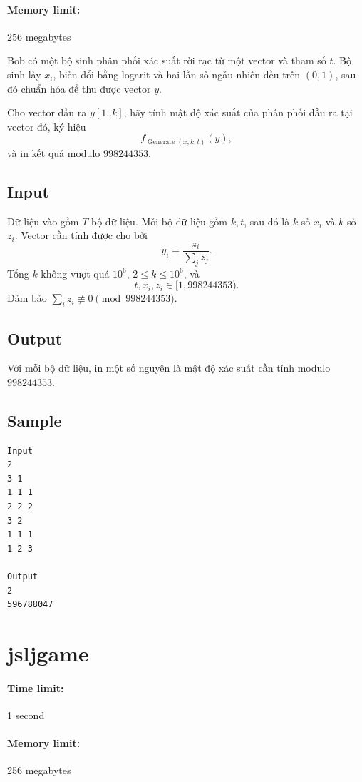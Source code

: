 \documentclass[11pt]{article}
\begin{document}
\paragraph{Memory limit:} 256 megabytes

Bob có một bộ sinh phân phối xác suất rời rạc từ một vector và tham số \(t\).
Bộ sinh lấy \(x_i\), biến đổi bằng logarit và hai lần số ngẫu nhiên đều trên
\((0,1)\), sau đó chuẩn hóa để thu được vector \(y\).

Cho vector đầu ra \(y[1..k]\), hãy tính mật độ xác suất của phân phối đầu ra
tại vector đó, ký hiệu
\[
  f_{\operatorname{Generate}(x,k,t)}(y),
\]
và in kết quả modulo \(998244353\).

\subsection*{Input}

Dữ liệu vào gồm \(T\) bộ dữ liệu. Mỗi bộ dữ liệu gồm \(k,t\), sau đó là \(k\) số
\(x_i\) và \(k\) số \(z_i\). Vector cần tính được cho bởi
\[
  y_i=\frac{z_i}{\sum_j z_j}.
\]
Tổng \(k\) không vượt quá \(10^6\), \(2\le k\le 10^6\), và
\[
  t,x_i,z_i\in[1,998244353).
\]
Đảm bảo \(\sum_i z_i\not\equiv0\pmod {998244353}\).

\subsection*{Output}

Với mỗi bộ dữ liệu, in một số nguyên là mật độ xác suất cần tính modulo
\(998244353\).

\subsection*{Sample}

\begin{verbatim}
Input
2
3 1
1 1 1
2 2 2
3 2
1 1 1
1 2 3

Output
2
596788047
\end{verbatim}

\section{jsljgame}

\paragraph{Time limit:} 1 second
\paragraph{Memory limit:} 256 megabytes
\end{document}
